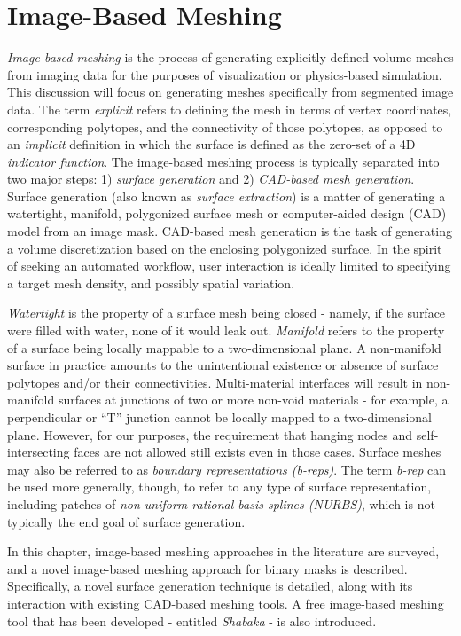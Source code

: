 \chapter{Image-Based Meshing}
\label{chap:3}

\textit{Image-based meshing} is the process of generating explicitly defined volume meshes from imaging data for the purposes of visualization or physics-based simulation. This discussion will focus on generating meshes specifically from segmented image data. The term \textit{explicit} refers to defining the mesh in terms of vertex coordinates, corresponding polytopes, and the connectivity of those polytopes, as opposed to an \textit{implicit} definition in which the surface is defined as the zero-set of a 4D \textit{indicator function}. The image-based meshing process is typically separated into two major steps: 1) \textit{surface generation} and 2) \textit{CAD-based mesh generation}. Surface generation (also known as \textit{surface extraction}) is a matter of generating a watertight, manifold, polygonized surface mesh or computer-aided design (CAD) model from an image mask. CAD-based mesh generation is the task of generating a volume discretization based on the enclosing polygonized surface. In the spirit of seeking an automated workflow, user interaction is ideally limited to specifying a target mesh density, and possibly spatial variation.

\textit{Watertight} is the property of a surface mesh being closed - namely, if the surface were filled with water, none of it would leak out. \textit{Manifold} refers to the property of a surface being locally mappable to a two-dimensional plane. A non-manifold surface in practice amounts to the unintentional existence or absence of surface polytopes and/or their connectivities. Multi-material interfaces will result in non-manifold surfaces at junctions of two or more non-void materials - for example, a perpendicular or ``T'' junction cannot be locally mapped to a two-dimensional plane. However, for our purposes, the requirement that hanging nodes and self-intersecting faces are not allowed still exists even in those cases. Surface meshes may also be referred to as \textit{boundary representations (b-reps)}. The term \textit{b-rep} can be used more generally, though, to refer to any type of surface representation, including patches of \textit{non-uniform rational basis splines (NURBS)}, which is not typically the end goal of surface generation. 

In this chapter, image-based meshing approaches in the literature are surveyed, and a novel image-based meshing approach for binary masks is described. Specifically, a novel surface generation technique is detailed, along with its interaction with existing CAD-based meshing tools. A free image-based meshing tool that has been developed - entitled \textit{Shabaka} - is also introduced.

